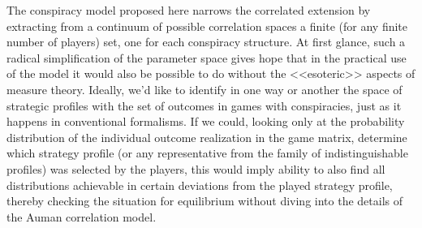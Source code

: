 The conspiracy model proposed here narrows the correlated extension by extracting from a continuum of possible correlation spaces a finite (for any finite number of players) set, one for each conspiracy structure. At first glance, such a radical simplification of the parameter space gives hope that in the practical use of the model it would also be possible to do without the <<esoteric>> aspects of measure theory. Ideally, we'd like to identify in one way or another the space of strategic profiles with the set of outcomes in games with conspiracies, just as it happens in conventional formalisms. If we could, looking only at the probability distribution of the individual outcome realization in the game matrix, determine which strategy profile (or any representative from the family of indistinguishable profiles) was selected by the players, this would imply ability to also find all distributions achievable in certain deviations from the played strategy profile, thereby checking the situation for equilibrium without diving into the details of the Auman correlation model. %

